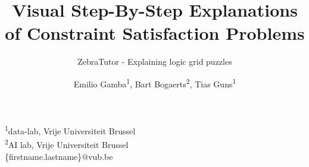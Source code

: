 \documentclass{beamer}
\title{Visual Step-By-Step Explanations of Constraint Satisfaction Problems}
\subtitle{ZebraTutor - Explaining logic grid puzzles}
\author{Emilio Gamba\textsuperscript{1}, Bart Bogaerts\textsuperscript{2}, Tias Guns\textsuperscript{1}}
\date{}
\begin{document}

\begin{frame}
    \maketitle
    \begin{center}
        
    \end{center}
    \tiny{\textsuperscript{1}data-lab, Vrije Universiteit Brussel}\\
    \tiny{\textsuperscript{2}AI lab, Vrije Universiteit Brussel}\\
    \tiny{\{firstname.lastname\}@vub.be}


\end{frame}
\end{document}
